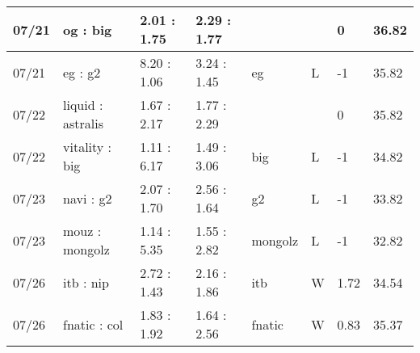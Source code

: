 \begin{small}
\begin{longtable}{|l|l|l|l|l|l|l|l|}
	07/21                               & og : big                            & 2.01 : 1.75                             & 2.29 : 1.77                             &                                   &                                   & 0                                    & 36.82                             \\ \hline
	07/21                               & eg : g2                             & 8.20 : 1.06                             & 3.24 : 1.45                             & eg                                & L                                 & -1                                   & 35.82                             \\ \hline
	07/22                               & liquid : astralis                   & 1.67 : 2.17                             & 1.77 : 2.29                             &                                   &                                   & 0                                    & 35.82                             \\ \hline
	07/22                               & vitality : big                      & 1.11 : 6.17                             & 1.49 : 3.06                             & big                               & L                                 & -1                                   & 34.82                             \\ \hline
	07/23                               & navi : g2                           & 2.07 : 1.70                             & 2.56 : 1.64                             & g2                                & L                                 & -1                                   & 33.82                             \\ \hline
	07/23                               & mouz : mongolz                      & 1.14 : 5.35                             & 1.55 : 2.82                             & mongolz                           & L                                 & -1                                   & 32.82                             \\ \hline
	07/26                               & itb : nip                           & 2.72 : 1.43                             & 2.16 : 1.86                             & itb                               & W                                 & 1.72                                 & 34.54                             \\ \hline
	07/26                               & fnatic : col                        & 1.83 : 1.92                             & 1.64 : 2.56                             & fnatic                            & W                                 & 0.83                                 & 35.37                             \\ \hline

\end{longtable}
\end{small}
